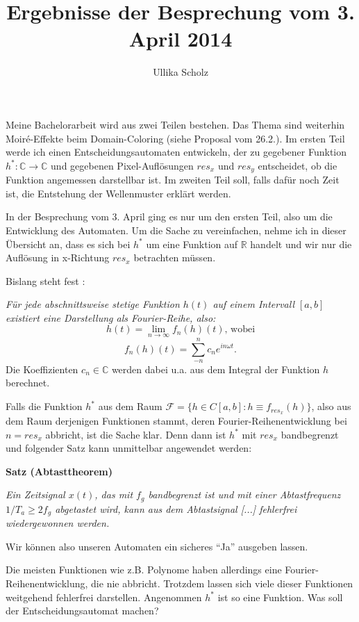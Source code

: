 \documentclass[a4paper]{article}
\begin{document}
\title{Ergebnisse der Besprechung vom 3. April 2014}
\date{}
\author{Ullika Scholz}
\maketitle
\thispagestyle{empty}
\setlength{\parskip}{6pt}

Meine Bachelorarbeit wird aus zwei Teilen bestehen. Das Thema sind weiterhin Moiré-Effekte beim Domain-Coloring (siehe Proposal vom 26.2.). Im ersten Teil werde ich einen Entscheidungsautomaten entwickeln, der zu gegebener Funktion $h^*: \mathbb{C} \rightarrow \mathbb{C}$ und gegebenen Pixel-Auflösungen $res_x$ und $res_y$ entscheidet, ob die Funktion angemessen darstellbar ist. Im zweiten Teil soll, falls dafür noch Zeit ist, die Entstehung der Wellenmuster erklärt werden.

In der Besprechung vom 3. April ging es nur um den ersten Teil, also um die Entwicklung des Automaten. Um die Sache zu vereinfachen, nehme ich in dieser Übersicht an, dass es sich bei $h^*$ um eine Funktion auf $\mathbb{R}$ handelt und wir nur die Auflösung in x-Richtung $res_x$ betrachten müssen.

Bislang steht fest \cite[vgl.][]{MuellerWichards1999}:

\textit{Für jede abschnittsweise stetige Funktion $h(t)$ auf einem Intervall $[a,b]$ existiert eine Darstellung als Fourier-Reihe, also:}
$$h(t)=\lim\limits_{n \rightarrow \infty} f_n(h)(t) \text{, wobei}$$
$$f_n(h)(t)=\sum\limits_{-n}^{n} c_n e^{in \omega t}.$$
Die Koeffizienten $c_n \in \mathbb{C}$ werden dabei u.a. aus dem Integral der Funktion $h$ berechnet.

Falls die Funktion $h^*$ aus dem Raum $\mathcal{F}=\{h \in C[a,b]: h \equiv f_{res_x}(h) \}$, also aus dem Raum derjenigen Funktionen stammt, deren Fourier-Reihenentwicklung bei $n=res_x$ abbricht, ist die Sache klar. Denn dann ist $h^*$ mit $res_x$ bandbegrenzt und folgender Satz kann unmittelbar angewendet werden:

\textbf{Satz (Abtasttheorem)} \cite[nach][]{MuellerWichards1999}

\textit{Ein Zeitsignal $x(t)$, das mit $f_g$ bandbegrenzt ist und mit einer Abtastfrequenz $1/T_a \geq 2 f_g$ abgetastet wird, kann aus dem Abtastsignal [...] fehlerfrei wiedergewonnen werden.}

Wir können also unseren Automaten ein sicheres "`Ja"'  ausgeben lassen.

Die meisten Funktionen wie z.B. Polynome haben allerdings eine Fourier-Rei\-henentwicklung, die nie abbricht. Trotzdem lassen sich viele dieser Funktionen weitgehend fehlerfrei darstellen. Angenommen $h^*$ ist so eine Funktion. Was soll der Entscheidungsautomat  machen?
\end{document}
